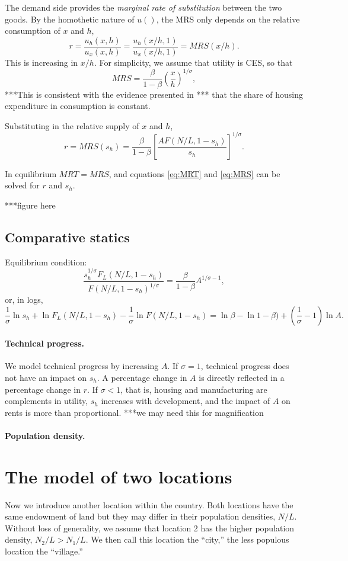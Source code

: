 \documentclass[12pt]{article}
\begin{document}
The demand side provides the \emph{marginal rate of substitution} between the two goods. By the homothetic nature of $u()$, the MRS only depends on the relative consumption of $x$ and $h$,
\[
r = \frac{u_h(x,h)}{u_x(x,h)} = \frac{u_h(x/h,1)}{u_x(x/h,1)} = MRS(x/h).
\]
This is increasing in $x/h$. For simplicity, we assume that utility is CES, so that
\[
MRS = \frac{\beta}{1-\beta}\left(\frac{x}{h}\right)^{1/\sigma},
\]
***This is consistent with the evidence presented in *** that the share of housing expenditure in consumption is constant.

Substituting in the relative supply of $x$ and $h$,
\begin{equation}\label{eq:MRS}
r = MRS(s_h) = \frac{\beta}{1-\beta}\left[\frac{AF(N/L,1-s_h)}{s_h}\right]^{1/\sigma}.
\end{equation}

In equilibrium $MRT=MRS$, and equations \eqref{eq:MRT} and \eqref{eq:MRS} can be solved for $r$ and $s_h$.

***figure here

\subsection{Comparative statics}
Equilibrium condition:
\[
\frac{s_h^{1/\sigma}F_L(N/L,1-s_h)}{F(N/L,1-s_h)^{1/\sigma}} = \frac{\beta}{1-\beta}A^{1/\sigma-1},
\]
or, in logs,
\[
\frac1\sigma\ln{s_h}+\ln F_L(N/L,1-s_h)-\frac1\sigma\ln{F(N/L,1-s_h)} = \ln{\beta}-\ln{1-\beta})+\left({\frac1\sigma-1}\right)\ln A.
\]

\paragraph{Technical progress.} We model technical progress by increasing $A$. If $\sigma=1$, technical progress does not have an impact on $s_h$. A percentage change in $A$ is directly reflected in a percentage change in $r$. If $\sigma<1$, that is, housing and manufacturing are complements in utility, $s_h$ increases with development, and the impact of $A$ on rents is more than proportional. ***we may need this for magnification
\paragraph{Population density.}

\section{The model of two locations}
Now we introduce another location within the country. Both  locations have the same endowment of land but they may differ in their population densities, $N/L$. Without loss of generality, we assume that location 2 has the higher population density, $N_2/L>N_1/L$. We then call this location the ``city,'' the less populous location the ``village.''
\end{document}
